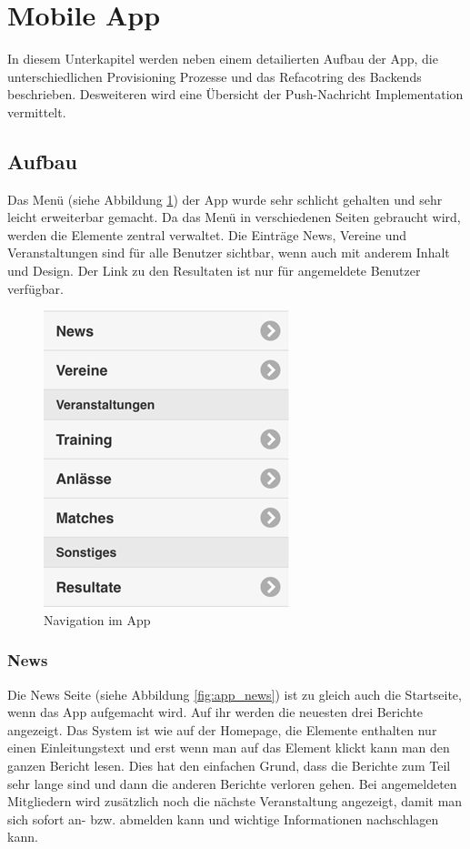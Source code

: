 \FloatBarrier


\clearpage
\section{Mobile App}\label{impl_moblie_app}
In diesem Unterkapitel werden neben einem detailierten Aufbau der App, die unterschiedlichen Provisioning Prozesse und das Refacotring des Backends beschrieben. Desweiteren wird eine Übersicht der Push-Nachricht Implementation vermittelt.

\subsection{Aufbau}
Das Menü (siehe Abbildung \ref{fig:navigation}) der App wurde sehr schlicht gehalten und sehr leicht erweiterbar gemacht. Da das Menü in verschiedenen Seiten gebraucht wird, werden die Elemente zentral verwaltet. Die Einträge News, Vereine und Veranstaltungen sind für alle Benutzer sichtbar, wenn auch mit anderem Inhalt und Design. Der Link zu den Resultaten ist nur für angemeldete Benutzer verfügbar.

\begin{figure}[h]
\centering
\includegraphics{images/app/navigation.png}
\caption{Navigation im App}
\label{fig:navigation}
\end{figure}

\FloatBarrier
\subsubsection{News}
Die News Seite (siehe Abbildung \ref{fig:app_news}) ist zu gleich auch die Startseite, wenn das App aufgemacht wird. Auf ihr werden die neuesten drei Berichte angezeigt. Das System ist wie auf der Homepage, die Elemente enthalten nur einen Einleitungstext und erst wenn man auf das Element klickt kann man den ganzen Bericht lesen. Dies hat den einfachen Grund, dass die Berichte zum Teil sehr lange sind und dann die anderen Berichte verloren gehen. Bei angemeldeten Mitgliedern wird zusätzlich noch die nächste Veranstaltung angezeigt, damit man sich sofort an- bzw. abmelden kann und wichtige Informationen nachschlagen kann.

